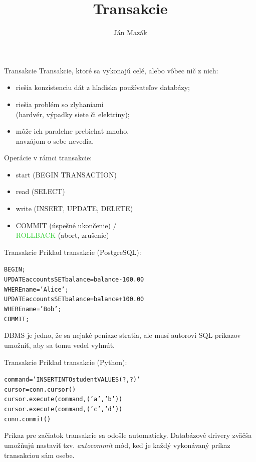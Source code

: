 \documentclass[12pt]{beamer}
\title{Transakcie}
\author{Ján Mazák}
\institute{FMFI UK Bratislava}
\date{}
\def\blue#1{\textcolor{Cerulean}{#1}}
\def\green#1{\textcolor{LimeGreen}{#1}}
\begin{document}
\frame{\titlepage}


\begin{frame}[fragile]{Transakcie}
\alert{Transakcie}, ktoré sa vykonajú celé, alebo vôbec nič z nich:
\begin{itemize}
\item riešia konzistenciu dát z hľadiska používateľov databázy;
\item riešia problém so zlyhaniami\\ (hardvér, výpadky siete či elektriny);
\item môže ich paralelne prebiehať mnoho,\\ navzájom o sebe nevedia.
\end{itemize}

\bigskip
Operácie v rámci transakcie:
\begin{itemize}
\item start (BEGIN TRANSACTION)
\item read (SELECT)
\item write (INSERT, UPDATE, DELETE)
\item \blue{COMMIT} (úspešné ukončenie) /\\\green{ROLLBACK} (abort, zrušenie)
\end{itemize}
\end{frame}


\begin{frame}[fragile]{Transakcie}
Príklad transakcie (PostgreSQL):
\begin{alltt}
    BEGIN;
    UPDATE accounts SET balance = balance - 100.00
        WHERE name = 'Alice';
    UPDATE accounts SET balance = balance + 100.00
        WHERE name = 'Bob';
    COMMIT;
\end{alltt}
DBMS je jedno, že sa nejaké peniaze stratia, ale musí autorovi SQL príkazov umožniť, aby sa tomu vedel vyhnúť.
\end{frame}


\begin{frame}[fragile]{Transakcie}
Príklad transakcie (Python):
\begin{alltt}
    command = 'INSERT INTO student VALUES (?, ?)'
    cursor = conn.cursor()
    cursor.execute(command, ('a', 'b'))
    cursor.execute(command, ('c', 'd'))
    conn.commit()
\end{alltt}
Príkaz pre začiatok transakcie sa odošle automaticky.
Databázové drivery zväčša umožňujú nastaviť tzv. \emph{autocommit} mód,
keď je každý vykonávaný príkaz transakciou sám osebe.
\end{frame}
\end{document}
